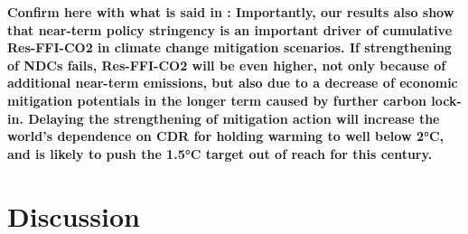 %

%



\textbf{Confirm here with what is said in \cite{luderer2018residual}: 
Importantly, our results also show that near-term policy stringency is an important driver of cumulative Res-FFI-CO2 in climate change mitigation scenarios. If strengthening of NDCs fails, Res-FFI-CO2 will be even higher, not only because of additional near-term emissions, but also due to a decrease of economic mitigation potentials in the longer term caused by further carbon lock-in. Delaying the strengthening of mitigation action will increase the world’s dependence on CDR for holding warming to well below 2°C, and is likely to push the 1.5°C target out of reach for this century.}

\section{Discussion}
\label{sec:RL:discussion}


